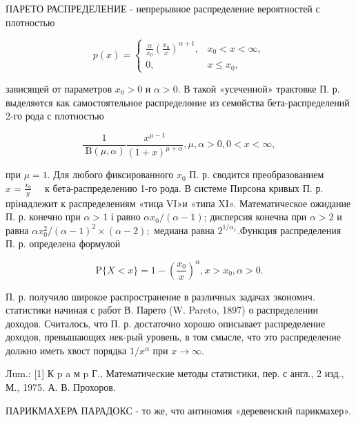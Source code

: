 \documentclass[10pt]{article}
\begin{document}
ПАРЕТО РАСПРЕДЕЛЕНИЕ - непрерывное распределение вероятностей с плотностью



\[

p(x)= \begin{cases}\frac{\alpha}{x_{0}}\left(\frac{x_{0}}{x}\right)^{\alpha+1}, & x_{0}<x<\infty, \\ 0, & x \leqslant x_{0},\end{cases}

\]



зависящей от параметров $x_{0}>0$ и $\alpha>0$. В такой «усеченной» трактовке П. р. выделяөтся как самостоятельное распределөние из семөйства бета-распределений 2-го рода с плотностью



\[

\frac{1}{\mathrm{~B}(\mu, \alpha)} \frac{x^{\mu-1}}{(1+x)^{\mu+\alpha}}, \mu, \alpha>0,0<x<\infty,

\]



при $\mu=1$. Для любого фиксированного $x_{0}$ П. р. сводится преобразованием $x=\frac{x_{0}}{y} \quad$ к бета-распределению 1-го рода. В системе Пирсона кривых П. р. прінадлежит к распределениям «тица VI»и «типа XI». Математическое ожидание П. р. конечно при $\alpha>1$ і равно $\alpha x_{0} /(\alpha-1)$; дисперсия конечна при $\alpha>2$ и равна $\alpha x_{0}^{2} /(\alpha-1)^{2} \times(\alpha-2) ;$ медиана равна $2^{1 / \alpha_{x}}$.Функция распределения П. р. определена формулоӥ



\[

\mathrm{P}\{X<x\}=1-\left(\frac{x_{0}}{x}\right)^{\alpha}, x>x_{0}, \alpha>0 .

\]



П. р. получило широкое распространение в различных задачах экономич. статистики начиная с работ В. Парето (W. Pareto, 1897) о распределении доходов. Считалось, что П. р. достаточно хорошо описывает распределение доходов, превышающих нек-рый уровень, в том смысле, что это распределение должно иметь хвост порядка $1 / x^{\alpha}$ при $x \rightarrow \infty$.



Лum.: [1] К p a м p Г., Математические методы статистики, пер. с англ., 2 изд., М., 1975. $А$. В. Прохоров.



ПАРИКМАХЕРА ПАРАДОКС - то же, что антиномия «деревенский парикмахер».
\end{document}
